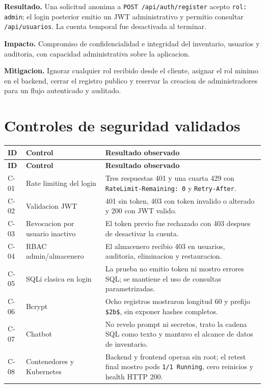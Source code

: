 \begin{tcolorbox}[criticalbox,title={F-01 - Escalacion de privilegios desde el registro}]
\textbf{Resultado.} Una solicitud anonima a
\texttt{POST /api/auth/register} acepto \texttt{rol: admin}; el login
posterior emitio un JWT administrativo y permitio consultar
\texttt{/api/usuarios}. La cuenta temporal fue desactivada al terminar.

\textbf{Impacto.} Compromiso de confidencialidad e integridad del inventario,
usuarios y auditoria, con capacidad administrativa sobre la aplicacion.

\textbf{Mitigacion.} Ignorar cualquier rol recibido desde el cliente,
asignar el rol minimo en el backend, cerrar el registro publico y reservar la
creacion de administradores para un flujo autenticado y auditado.
\end{tcolorbox}

\section{Controles de seguridad validados}

\begin{center}
\label{tab:controles-validados}
\end{center}
{\def\LTcaptype{none}
\begin{longtable}{p{}p{}p{}}
\toprule
\textbf{ID} & \textbf{Control} & \textbf{Resultado observado} \\
\midrule
\endfirsthead
\toprule
\textbf{ID} & \textbf{Control} & \textbf{Resultado observado} \\
\midrule
\endhead
C-01 & Rate limiting del login &
Tres respuestas 401 y una cuarta 429 con
\texttt{RateLimit-Remaining: 0} y \texttt{Retry-After}. \\
C-02 & Validacion JWT &
401 sin token, 403 con token invalido o alterado y 200 con JWT valido. \\
C-03 & Revocacion por usuario inactivo &
El token previo fue rechazado con 403 despues de desactivar la cuenta. \\
C-04 & RBAC admin/almacenero &
El almacenero recibio 403 en usuarios, auditoria, eliminacion y restauracion. \\
C-05 & SQLi clasica en login &
La prueba no emitio token ni mostro errores SQL; se mantiene el uso de
consultas parametrizadas. \\
C-06 & Bcrypt &
Ocho registros mostraron longitud 60 y prefijo \texttt{\$2b\$}, sin exponer
hashes completos. \\
C-07 & Chatbot &
No revelo prompt ni secretos, trato la cadena SQL como texto y mantuvo el
alcance de datos de inventario. \\
C-08 & Contenedores y Kubernetes &
Backend y frontend operan sin root; el retest final mostro pods
\texttt{1/1 Running}, cero reinicios y health HTTP 200. \\
\bottomrule
\end{longtable}
}

